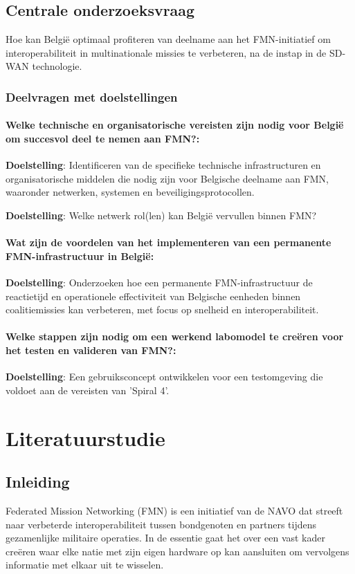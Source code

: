 \subsection{Centrale onderzoeksvraag}%
Hoe kan België optimaal profiteren van deelname aan het FMN-initiatief om interoperabiliteit in multinationale missies te verbeteren, na de instap in de SD-WAN technologie.
\subsubsection{Deelvragen met doelstellingen}%
\paragraph{Welke technische en organisatorische vereisten zijn nodig voor België om succesvol deel te nemen aan FMN?:\\}
\textbf{Doelstelling}: Identificeren van de specifieke technische infrastructuren en organisatorische middelen die nodig zijn voor Belgische deelname aan FMN, waaronder netwerken, systemen en beveiligingsprotocollen.

\textbf{Doelstelling}: Welke netwerk rol(len) kan België vervullen binnen FMN?
\paragraph{Wat zijn de voordelen van het implementeren van een permanente FMN-infrastructuur in België:\\}
\textbf{Doelstelling}: Onderzoeken hoe een permanente FMN-infrastructuur de reactietijd en operationele effectiviteit van Belgische eenheden binnen coalitiemissies kan verbeteren, met focus op snelheid en interoperabiliteit.
\paragraph{Welke stappen zijn nodig om een werkend labomodel te creëren voor het testen en valideren van FMN?:\\}
\textbf{Doelstelling}: Een gebruiksconcept ontwikkelen voor een testomgeving die voldoet aan de vereisten van 'Spiral 4'.

\section{Literatuurstudie}%
\label{sec:literatuurstudie}
\subsection{Inleiding}
Federated Mission Networking (FMN) is een initiatief van de NAVO dat streeft naar verbeterde interoperabiliteit tussen bondgenoten en partners tijdens gezamenlijke militaire operaties. In de essentie gaat het over een vast kader creëren waar elke natie met zijn eigen hardware op kan aansluiten om vervolgens informatie met elkaar uit te wisselen.
 

